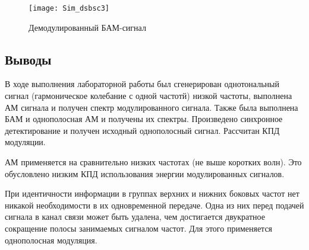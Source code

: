 \documentclass[10pt,a4paper]{article}
\begin{document}
\begin{figure}[h]\centering
	\texttt{[image: Sim\_dsbsc3]}
	\caption{Демодулированный БАМ-сигнал}\label{fig.Sim_dsbsc3}
\end{figure}                                                                                                                                                                                                                                                                                                                                                                                                                                                                                                                                                                                                                                                                                                                                                                                                                                                                                                                                                                                                                                                                                                                                                                                                                                                                                                                                                                                                                                                                        

\FloatBarrier

\subsection{Выводы}
В ходе выполнения лабораторной работы был сгенерирован однотональный сигнал (гармоническое колебание с одной частотй) низкой частоты, выполнена АМ сигнала и получен спектр модулированного сигнала. Также была выполнена БАМ и однополосная АМ и получены их спектры. Произведено синхронное детектирование и получен исходный однополосный сигнал. Рассчитан КПД модуляции.

АМ применяется на сравнительно низких частотах (не выше коротких волн). Это обусловлено низким КПД использования энергии модулированных сигналов.

При идентичности информации в группах верхних и нижних боковых частот нет никакой необходимости в их одновременной передаче. Одна из них перед подачей сигнала в канал связи может быть удалена, чем достигается двукратное сокращение полосы занимаемых сигналом частот. 
Для этого применяется однополосная модуляция. 
\end{document}
